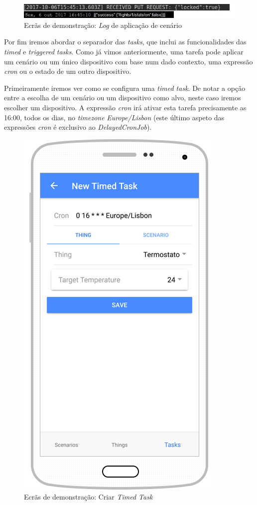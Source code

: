 \begin{figure}[H]
  \centering
        \includegraphics[scale=0.6]{img/demo/scenario_apply_log.jpg}
  \caption{Ecrãs de demonstração: \textit{Log} de aplicação de cenário}
\end{figure}

Por fim iremos abordar o separador das \textit{tasks}, que inclui as funcionalidades das \textit{timed} e \textit{triggered} \textit{tasks}. Como já vimos anteriormente, uma tarefa pode aplicar um cenário ou um único dispositivo com base num dado contexto, uma expressão \textit{cron} ou o estado de um outro dispositivo.

Primeiramente iremos ver como se configura uma \textit{timed task}. De notar a opção entre a escolha de um cenário ou um dispositivo como alvo, neste caso iremos escolher um dispositivo. A expressão \textit{cron} irá ativar esta tarefa precisamente as 16:00, todos os dias, no \textit{timezone} \textit{Europe/Lisbon} (este último aspeto das expressões \textit{cron} é exclusivo ao \textit{DelayedCronJob}). 

\begin{figure}[H]
  \centering
        \includegraphics[scale=0.75]{img/demo/new_timed_task.png}
  \caption{Ecrãs de demonstração: Criar \textit{Timed Task}}
\end{figure}

